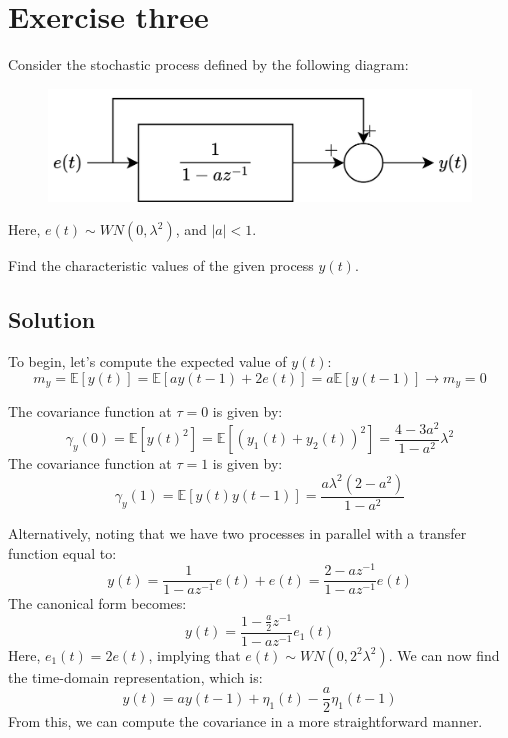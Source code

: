 \section{Exercise three}

Consider the stochastic process defined by the following diagram:
\begin{figure}[H]
    \centering
    \includegraphics[width=0.5\linewidth]{images/block2.png}
\end{figure}
Here, $e(t) \sim WN(0,\lambda^2)$, and $\left\lvert a\right\rvert <1$.

Find the characteristic values of the given process $y(t)$.

\subsection*{Solution}
To begin, let's compute the expected value of $y(t)$:
\[m_y=\mathbb{E}\left[ y(t) \right]=\mathbb{E}\left[ ay(t-1)+2e(t) \right]=a\mathbb{E}\left[ y(t-1) \right]\rightarrow m_y=0\]

The covariance function at $\tau=0$ is given by:
\[\gamma_y(0)=\mathbb{E}\left[ y(t)^2 \right]=\mathbb{E}\left[ \left(y_1(t)+y_2(t)\right)^2 \right]=\dfrac{4-3a^2}{1-a^2}\lambda^2\]
The covariance function at $\tau=1$ is given by:
\[\gamma_y(1)=\mathbb{E}\left[ y(t)y(t-1) \right]=\dfrac{a\lambda^2(2-a^2)}{1-a^2}\]

Alternatively, noting that we have two processes in parallel with a transfer function equal to:
\[y(t)=\dfrac{1}{1-az^{-1}}e(t)+e(t)=\dfrac{2-az^{-1}}{1-az^{-1}}e(t)\]
The canonical form becomes:
\[y(t)=\dfrac{1-\frac{a}{2}z^{-1}}{1-az^{-1}}e_1(t)\]
Here, $e_1(t)=2e(t)$, implying that $e(t) \sim WN(0,2^2\lambda^2)$.
We can now find the time-domain representation, which is:
\[y(t)=ay(t-1)+\eta_1(t)-\dfrac{a}{2}\eta_1(t-1)\]
From this, we can compute the covariance in a more straightforward manner.